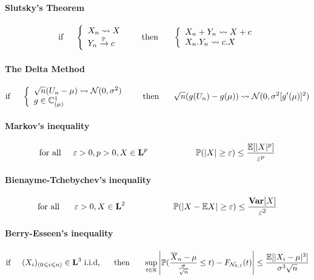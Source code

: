 \documentclass[a4paper,10pt]{article}
\begin{document}
\paragraph{Slutsky's Theorem}
\[
\text{if} \hspace{5mm} 
\left\{ 
\begin{array}{l}
X_n \rightsquigarrow X \\
Y_n \xrightarrow{\mathbb{P}} c 
\end{array}\right. 
\hspace{5mm} \text{ then  } \hspace{5mm}
\left\{ 
\begin{array}{l}
X_n + Y_n \rightsquigarrow X+c \\
X_n . Y_n \rightsquigarrow  c.X 
\end{array}\right. 
\]

\paragraph{The Delta Method}
\[
\text{if} \hspace{5mm} 
\left\{ 
\begin{array}{l}
\sqrt{n}(U_n - \mu) \rightsquigarrow   \mathcal{N}(0,\sigma^{2}) \\
g \in \mathbb{C}^1_{(\mu)}
\end{array}\right. 
\hspace{5mm} \text{ then  } \hspace{5mm}
\sqrt{n}(g(U_n) - g(\mu) ) \rightsquigarrow   \mathcal{N}(0,\sigma^{2}[g'(\mu)]^2) 
\]

\paragraph{Markov's inequality}
\[
\text{for all}\hspace{5mm} \varepsilon > 0, p>0, X\in \textbf{L}^p \hspace{20mm} \mathbb{P}(|X| \geq \varepsilon) \leq \frac{\mathbb{E}[|X|^p]}{\varepsilon ^p}
\]
\paragraph{Bienayme-Tchebychev's inequality}
\[
\text{for all  } \hspace{5mm} \varepsilon > 0, X\in \textbf{L}^2 \hspace{20mm} \mathbb{P}(|X- \mathbb{E}X| \geq \varepsilon) \leq \frac{\textbf{Var}[X]}{\varepsilon ^2}
\]
\paragraph{Berry-Esseen's inequality}
\[
\text{if} \hspace{5mm} (X_{i})_{(0\leqslant i \leqslant n)} \in \textbf{L}^3 \text{  i.i.d,} \hspace{5mm} \text{ then  } \hspace{5mm}
\sup_{t\in \mathbb{R}} \left| \mathbb{P}(\frac{\overline{X}_n - \mu}{\frac{\sigma}{\sqrt{n}}} \leq t) - F_{\mathcal{N}_{0,1}}(t) \right| 
\leq \frac{\mathbb{E}[|X_i - \mu|^3]}{\sigma^3 \sqrt{n}}
\]
\end{document}
